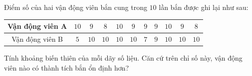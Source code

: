 \begin{ex}
Điểm số của hai vận động viên bắn cung trong $10$ lần bắn được ghi lại như sau:
\begin{center}
\begin{tabular}{|c|c|c|c|c|c|c|c|c|c|c|}\hline
Vận động viên A & $10$ & $9$ & $8$ & $10$ & $9$ & $9$ & $9$ & $10$ & $9$ & $8$\\\hline
Vận động viên B & $5$ & $10$ & $10$ & $10$ & $10$ & $7$ & $9$ & $10$ & $10$ & $10$\\\hline
\end{tabular}
\end{center}
Tính khoảng biến thiên của mỗi dãy số liệu. Căn cứ trên chỉ số này, vận động viên nào có thành tích bắn ổn định hơn?
\end{ex}

